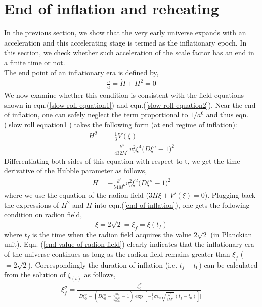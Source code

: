 \documentclass[a4paper]{article}
\begin{document}
\section{End of inflation and reheating}
In the previous section, we show that the very early universe expands with an acceleration and this accelerating stage is  
termed as the inflationary epoch. In this section, we check whether such acceleration of the scale factor 
has an end in a finite time or not.\\
The end point of an inflationary era is defined by,
\begin{eqnarray}
 \frac{\ddot{a}}{a} = \dot{H} + H^2 = 0        
 \label{end of inflation}
\end{eqnarray}
We now examine whether this condition is consistent with the field equations shown in eqn.(\ref{slow roll equation1}) 
and eqn.(\ref{slow roll equation2}). Near the end of inflation, one can safely neglect the term 
proportional to $1/a^6$ and thus eqn.(\ref{slow roll equation1}) takes the following form (at end regime of inflation):
\begin{eqnarray}
 H^2&=&\frac{1}{3}V(\xi)\nonumber\\
 &=&\frac{k^3}{432M^6}v_v^2\xi^4 \bigg(D\xi^{\sigma} - 1\bigg)^2
 \nonumber
\end{eqnarray}
Differentiating both sides of this equation with respect to t, we get the time derivative 
of the Hubble parameter as follows,
\begin{eqnarray}
 \dot{H} = -\frac{k^3}{54M^6}v_v^2\xi^2\bigg(D\xi^{\sigma} - 1\bigg)^2
 \label{time derivative of hubble}
\end{eqnarray}
where we use the equation of the radion field ($3H\dot{\xi}+V'(\xi)=0$). Plugging back the expressions 
of $H^2$ and $\dot{H}$ into eqn.(\ref{end of inflation}), one gets the following condition on radion field, 
\begin{equation}
 \xi = 2\sqrt{2} = \xi_f = \xi(t_f)
 \label{end value of radion field}
\end{equation}
where $t_f$ is the time when the radion field acquires the value $2\sqrt{2}$ (in Planckian unit). 
Eqn. (\ref{end value of radion field}) clearly indicates that the inflationary era of the universe continues as long as the radion field 
remains greater than $\xi_f$ ($= 2\sqrt{2}$). Correspondingly the duration of inflation (i.e. $t_f-t_0$) can 
be calculated from the solution of $\xi_(t)$ as follows,
\begin{eqnarray}
 \xi_f^{\sigma} = \frac{\xi_0^{\sigma}}{\bigg[D\xi_0^{\sigma}-(D\xi_0^{\sigma}-\frac{\sqrt{h_0}}{a_0^3\xi_0^2}-1)\exp
{[-\frac{1}{3}\sigma v_v\sqrt{\frac{k^3}{3M^6}}(t_f-t_0)]}\bigg]}
 \nonumber
\end{eqnarray}
\end{document}
